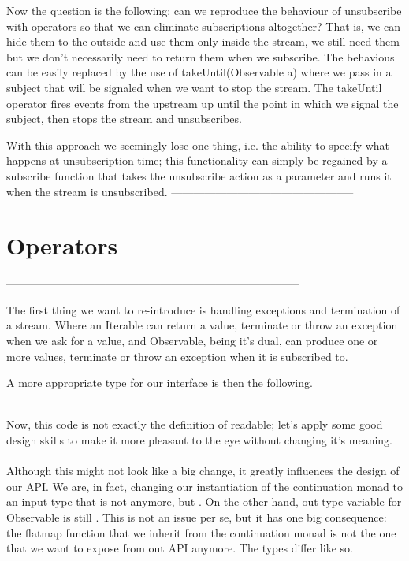 Now the question is the following: can we reproduce the behaviour of unsubscribe with operators so that we can eliminate subscriptions altogether? That is, we can hide them to the outside and use them only inside the stream, we still need them but we don't necessarily need to return them when we subscribe. The behavious can be easily replaced by the use of takeUntil(Observable a) where we pass in a subject that will be signaled when we want to stop the stream. The takeUntil operator fires events from the upstream up until the point in which we signal the subject, then stops the stream and unsubscribes. 

With this approach we seemingly lose one thing, i.e. the ability to specify what happens at unsubscription time; this functionality can simply be regained by a subscribe function that takes the unsubscribe action as a parameter and runs it when the stream is unsubscribed.
--------------------------------------------------

\section{Operators}
\label{operators}

--------------------------------------------------------------------------------

The first thing we want to re-introduce is handling exceptions and termination of a stream. Where an Iterable can return a value, terminate or throw an exception when we ask for a value, and Observable, being it's dual, can produce one or more values, terminate or throw an exception when it is subscribed to. 

A more appropriate type for our interface is then the following.\\

\\


Now, this code is not exactly the definition of readable; let's apply some good design skills to make it more pleasant to the eye without changing it's meaning.\\

\\

Although this might not look like a big change, it greatly influences the design of our API. We are, in fact, changing our instantiation of the continuation monad to an input type that is not  anymore, but . On the other hand, out type variable for Observable is still . This is not an issue per se, but it has one big consequence: the flatmap function that we inherit from the continuation monad is not the one that we want to expose from out API anymore. The types differ like so.\\

